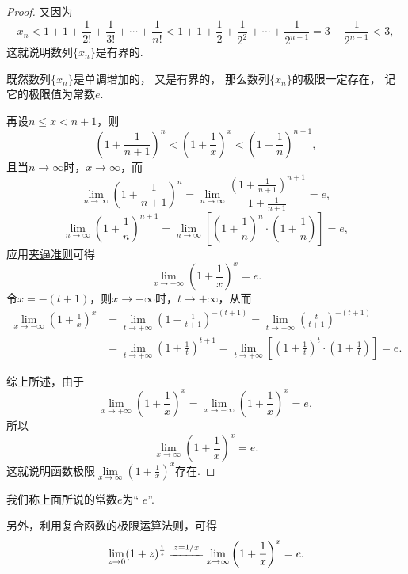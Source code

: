\begin{example}[重要极限II]
\begin{proof}
又因为\[
x_n < 1 + 1 + \frac{1}{2!} + \frac{1}{3!} + \dotsb + \frac{1}{n!}
< 1 + 1 + \frac{1}{2} + \frac{1}{2^2} + \dotsb + \frac{1}{2^{n-1}}
= 3 - \frac{1}{2^{n-1}} < 3,
\]这就说明数列\(\{x_n\}\)是有界的.

既然数列\(\{x_n\}\)是单调增加的，
又是有界的，
那么数列\(\{x_n\}\)的极限一定存在，
记它的极限值为常数\(e\).

再设\(n \leq x < n+1\)，则\[
\left(1+\frac{1}{n+1}\right)^n < \left(1+\frac{1}{x}\right)^x < \left(1+\frac{1}{n}\right)^{n+1},
\]且当\(n\to\infty\)时，\(x\to\infty\)，而\[
\lim\limits_{n\to\infty}\left(1+\frac{1}{n+1}\right)^n
=\lim\limits_{n\to\infty}\frac{\left(1+\frac{1}{n+1}\right)^{n+1}}{1+\frac{1}{n+1}} = e,
\]\[
\lim\limits_{n\to\infty}\left(1+\frac{1}{n}\right)^{n+1}
=\lim\limits_{n\to\infty}\left[\left(1+\frac{1}{n}\right)^n\cdot\left(1+\frac{1}{n}\right)\right]=e,
\]应用\hyperref[theorem:极限.夹逼准则]{夹逼准则}可得\[
\lim\limits_{x\to+\infty}\left(1+\frac{1}{x}\right)^x = e.
\]令\(x=-(t+1)\)，则\(x\to-\infty\)时，\(t\to+\infty\)，从而\begin{align*}
\lim\limits_{x\to-\infty}\left(1+\frac{1}{x}\right)^x
&=\lim\limits_{t\to+\infty}\left(1-\frac{1}{t+1}\right)^{-(t+1)}
=\lim\limits_{t\to+\infty}\left(\frac{t}{t+1}\right)^{-(t+1)} \\
&=\lim\limits_{t\to+\infty}\left(1+\frac{1}{t}\right)^{t+1}
=\lim\limits_{t\to+\infty}\left[\left(1+\frac{1}{t}\right)^t\cdot\left(1+\frac{1}{t}\right)\right]=e.
\end{align*}

综上所述，由于\[
\lim\limits_{x\to+\infty}\left(1+\frac{1}{x}\right)^x
= \lim\limits_{x\to-\infty}\left(1+\frac{1}{x}\right)^x
= e,
\]所以\begin{equation}\label{equation:极限.重要极限II}
\lim\limits_{x\to\infty} \left(1+\frac{1}{x}\right)^x = e.
\end{equation}
这就说明函数极限\(\lim\limits_{x\to\infty} \left(1+\frac{1}{x}\right)^x\)存在.
\end{proof}
\end{example}
我们称上面所说的常数\(e\)为“ \(e\)”.

另外，利用复合函数的极限运算法则，可得
\begin{equation}
\lim\limits_{z\to0}(1+z)^{\frac{1}{z}}
\xlongequal{z=1/x}
\lim\limits_{x\to\infty}\left(1+\frac{1}{x}\right)^x
= e.
\end{equation}

